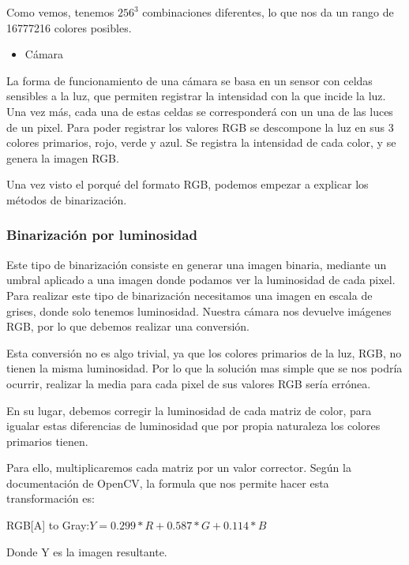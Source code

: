 Como vemos, tenemos $256^3$ combinaciones diferentes, lo que nos da un rango de 16777216 colores posibles.

\begin{itemize}

	\item Cámara
	
\end{itemize}

La forma de funcionamiento de una cámara se basa en un sensor con celdas sensibles a la luz, que permiten registrar la intensidad con la que incide la luz.
Una vez más, cada una de estas celdas se corresponderá con un una de las luces de un pixel. Para poder registrar los valores RGB se descompone la luz en sus 3 colores primarios, rojo, verde y azul. Se registra la intensidad de cada color, y se genera la imagen RGB.

Una vez visto el porqué del formato RGB, podemos empezar a explicar los métodos de binarización.

\subsubsection{Binarización por luminosidad}
Este tipo de binarización consiste en generar una imagen binaria, mediante un umbral aplicado a una imagen donde podamos ver la luminosidad de cada pixel.
Para realizar este tipo de binarización necesitamos una imagen en escala de grises, donde solo tenemos luminosidad. Nuestra cámara nos devuelve imágenes RGB, por lo que debemos realizar una conversión. 

Esta conversión no es algo trivial, ya que los colores primarios de la luz, RGB, no tienen la misma luminosidad. Por lo que la solución mas simple que se nos podría ocurrir, realizar la media para cada pixel de sus valores RGB sería errónea.

En su lugar, debemos corregir la luminosidad de cada matriz de color, para igualar estas diferencias de luminosidad que por propia naturaleza los colores primarios tienen. 

Para ello, multiplicaremos cada matriz por un valor corrector.
Según la documentación de OpenCV\cite{OpenCVRGBGRAY}, la formula que nos permite hacer esta transformación es:

RGB[A] to Gray:$Y=0.299*R+0.587*G+0.114*B$

Donde Y es la imagen resultante.

